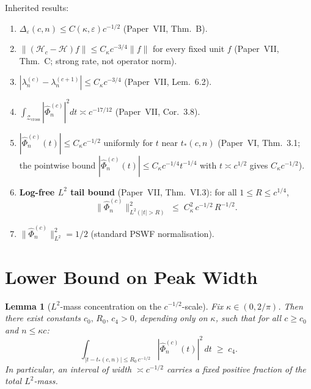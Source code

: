 \documentclass[12pt,a4paper]{amsart}
\newtheorem{lemma}[theorem]{Lemma}
\theoremstyle{definition}
\theoremstyle{remark}
\newcommand{\Phihat}{\widehat{\Phi}}
\newcommand{\Zcross}{\mathcal{Z}_{\mathrm{cross}}}
\newcommand{\tstar}{t_*(c,n)}
\newcommand{\Hc}{\mathcal{H}_c}
\newcommand{\Hlim}{\mathcal{H}}
\begin{document}
Inherited results:
\begin{enumerate}[(VII.1)]
\item\label{VII1}
      $\Delta_\varepsilon(c,n)\le C(\kappa,\varepsilon)c^{-1/2}$
      (Paper~VII, Thm.~B).
\item\label{VII2}
      $\|(\Hc-\Hlim)f\|\le C_\kappa c^{-3/4}\|f\|$
      for every fixed unit $f$
      (Paper~VII, Thm.~C; strong rate, not operator norm).
\item\label{VII3}
      $|\lambda_n^{(c)}-\lambda_n^{(c+1)}|\le C_\kappa c^{-3/4}$
      (Paper~VII, Lem.~6.2).
\item\label{VII4}
      $\int_{\Zcross}|\Phihat_n^{(c)}|^2 dt\asymp c^{-17/12}$
      (Paper~VII, Cor.~3.8).
\item\label{VII5}
      $|\Phihat_n^{(c)}(t)|\le C_\kappa c^{-1/2}$
      uniformly for $t$ near $t_*(c,n)$
      (Paper~VI, Thm.~3.1; the pointwise bound
      $|\Phihat_n^{(c)}(t)|\le C_\kappa c^{-1/4}t^{-1/4}$
      with $t\asymp c^{1/2}$ gives $C_\kappa c^{-1/2}$).
\item\label{VII6}
      \textbf{Log-free $L^2$ tail bound}
      (Paper~VII, Thm.~VI.3):
      for all $1\le R\le c^{1/4}$,
      \begin{equation}\label{eq:logfree-tail}
        \|\Phihat_n^{(c)}\|_{L^2(|t|>R)}^2
        \;\le\; C_\kappa^2\,c^{-1/2}\,R^{-1/2}.
      \end{equation}
\item\label{VIIA}
      $\|\Phihat_n^{(c)}\|_{L^2}^2=1/2$
      (standard PSWF normalisation).
\end{enumerate}

\section{Lower Bound on Peak Width}
\label{sec:lower}


\begin{lemma}[$L^2$-mass concentration on the $c^{-1/2}$-scale]
\label{lem:L2-mass}
Fix $\kappa\in(0,2/\pi)$.
Then there exist constants $c_0,\,R_0,\,c_4>0$,
depending only on $\kappa$,
such that for all $c\ge c_0$ and $n\le\kappa c$:
\[
  \int_{|t-\tstar|\le R_0\,c^{-1/2}}
  |\Phihat_n^{(c)}(t)|^2\,dt
  \;\ge\; c_4.
\]
In particular, an interval of width $\asymp c^{-1/2}$
carries a fixed positive fraction of the total $L^2$-mass.
\end{lemma}
\end{document}
